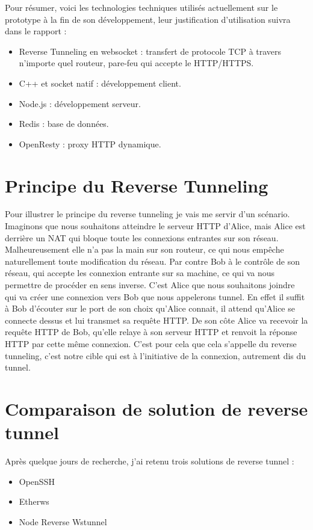 Pour résumer, voici les technologies techniques utilisés actuellement sur le prototype à la fin de son développement, leur justification d'utilisation suivra dans le rapport :

\begin{itemize}
    \item Reverse Tunneling en websocket : transfert de protocole TCP à travers n'importe quel routeur, pare-feu qui accepte le HTTP/HTTPS.
    \item C++ et socket natif : développement client.
    \item Node.js : développement serveur.
    \item Redis : base de données.
    \item OpenResty : proxy HTTP dynamique.
\end{itemize}

\section{Principe du Reverse Tunneling}

Pour illustrer le principe du reverse tunneling je vais me servir d'un scénario. Imaginons que nous souhaitons atteindre le serveur HTTP d'Alice, mais Alice est derrière un NAT qui bloque toute les connexions entrantes sur son réseau. Malheureusement elle n'a pas la main sur son routeur, ce qui nous empêche naturellement toute modification du réseau. Par contre Bob à le contrôle de son réseau, qui accepte les connexion entrante sur sa machine, ce qui va nous permettre de procéder en sens inverse. C'est Alice que nous souhaitons joindre qui va créer une connexion vers Bob que nous appelerons tunnel. En effet il suffit à Bob d'écouter sur le port de son choix qu'Alice connait, il attend qu'Alice se connecte dessus et lui transmet sa requête HTTP. De son côte Alice va recevoir la requête HTTP de Bob, qu'elle relaye à son serveur HTTP et renvoit la réponse HTTP par cette même connexion. C'est pour cela que cela s'appelle du reverse tunneling, c'est notre cible qui est à l'initiative de la connexion, autrement dis du tunnel.

\section{Comparaison de solution de reverse tunnel}

Après quelque jours de recherche, j'ai retenu trois solutions de reverse tunnel :

\begin{itemize}
    \item OpenSSH
    \item Etherws
    \item Node Reverse Wstunnel
\end{itemize}

